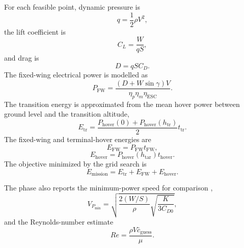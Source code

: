 For each feasible point, dynamic pressure is
\begin{equation}
    q = \frac{1}{2}\rho V^2,
    \label{eq:ppa_dynamic_pressure}
\end{equation}
the lift coefficient is
\begin{equation}
    C_L = \frac{W}{qS},
    \label{eq:ppa_cl_cruise}
\end{equation}
and drag is
\begin{equation}
    D = qS C_D.
    \label{eq:ppa_drag}
\end{equation}
The fixed-wing electrical power is modelled as
\begin{equation}
    P_{\mathrm{FW}} =
    \frac{\left(D+W\sin\gamma\right)V}{\eta_p\eta_m\eta_{\mathrm{ESC}}}.
    \label{eq:ppa_fw_power}
\end{equation}
The transition energy is approximated from the mean hover power between ground level and the transition altitude,
\begin{equation}
    E_{\mathrm{tr}} =
    \frac{P_{\mathrm{hover}}(0)+P_{\mathrm{hover}}(h_{\mathrm{tr}})}{2}
    t_{\mathrm{tr}}.
    \label{eq:ppa_transition_energy}
\end{equation}
The fixed-wing and terminal-hover energies are
\begin{equation}
    E_{\mathrm{FW}} = P_{\mathrm{FW}}t_{\mathrm{FW}},
    \label{eq:ppa_fw_energy}
\end{equation}
\begin{equation}
    E_{\mathrm{hover}} = P_{\mathrm{hover}}(h_{\mathrm{tar}})t_{\mathrm{hover}}.
    \label{eq:ppa_hover_energy}
\end{equation}
The objective minimized by the grid search is
\begin{equation}
    E_{\mathrm{mission}} =
    E_{\mathrm{tr}}+E_{\mathrm{FW}}+E_{\mathrm{hover}}.
    \label{eq:ppa_mission_energy}
\end{equation}

The phase also reports the minimum-power speed for comparison \cite{Raymer2018},
\begin{equation}
    V_{P_{\min}} =
    \sqrt{
    \frac{2(W/S)}{\rho}
    \sqrt{\frac{K}{3C_{D0}}}
    },
    \label{eq:ppa_min_power_speed}
\end{equation}
and the Reynolds-number estimate
\begin{equation}
    Re = \frac{\rho V \bar{c}_{\mathrm{guess}}}{\mu}.
    \label{eq:ppa_reynolds}
\end{equation}

